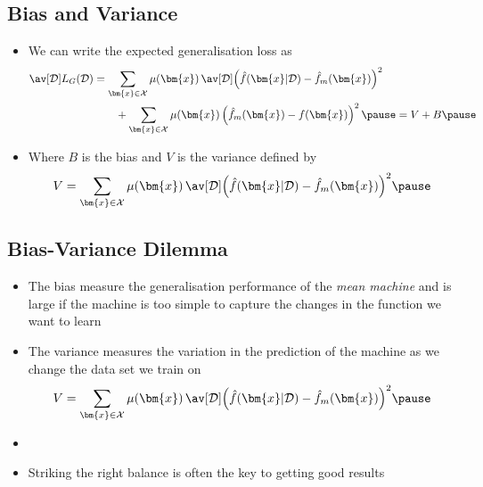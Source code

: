 \begin{slide}
\section[-2]{Bias and Variance}

\begin{PauseHighLight}
  \begin{itemize}
  \item We can write the expected generalisation loss as
    \begin{align*}
      \av[\mathcal{D}]{ L_G(\mathcal{D}) }
      &= \sum_{\bm{x}\in\mathcal{X}} \mu(\bm{x})\, 
      \av[\mathcal{D}]{ \left(\hat{f}(\bm{x}\vert \mathcal{D}) -
      \hat{f}_m(\bm{x})\right)^2 } \\
        & \quad \quad +
          \sum_{\bm{x}\in\mathcal{X}} \mu(\bm{x}) \left( \hat{f}_m(\bm{x})
      - f(\bm{x}) \right)^2 \pause
        = V + B\pause
    \end{align*}
  \item Where $B$ is the bias and $V$ is the variance defined by
    \begin{align*}
      V = \sum_{\bm{x}\in\mathcal{X}} \mu(\bm{x})\,
      \av[\mathcal{D}]{ \left(\hat{f}(\bm{x}\vert \mathcal{D}) -
      \hat{f}_m(\bm{x})\right)^2 }\pause 
    \end{align*}
  \end{itemize}
\end{PauseHighLight}

\end{slide}


\begin{slide}
\section{Bias-Variance Dilemma}

\begin{PauseHighLight}
  \begin{itemize}
  \item The bias measure the generalisation performance of the
    \textit{mean machine} and is large if the machine is too simple to
    capture the changes in the function we want to learn\pause
  \item The variance measures the variation in the prediction of the
    machine as we change the data set we train on
    \begin{align*}
      V =  \sum_{\bm{x}\in\mathcal{X}} \mu(\bm{x})\,
      \av[\mathcal{D}]{ \left(\hat{f}(\bm{x}\vert \mathcal{D})
      - \hat{f}_m(\bm{x})\right)^2 }\pause
    \end{align*}
  \item {}\pause
  \item Striking the right balance is often the key to getting good
    results\pause 
  \end{itemize}
\end{PauseHighLight}

\end{slide}

